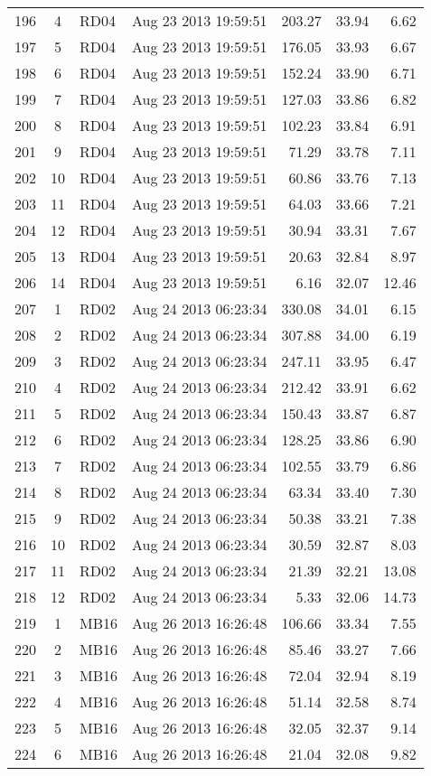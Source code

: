 \documentclass{article}
\begin{document}
\begin{longtable}{ccllrrr}
196&4&RD04&Aug 23 2013 19:59:51&203.27&33.94&6.62\\
197&5&RD04&Aug 23 2013 19:59:51&176.05&33.93&6.67\\
198&6&RD04&Aug 23 2013 19:59:51&152.24&33.90&6.71\\
199&7&RD04&Aug 23 2013 19:59:51&127.03&33.86&6.82\\
200&8&RD04&Aug 23 2013 19:59:51&102.23&33.84&6.91\\
201&9&RD04&Aug 23 2013 19:59:51&71.29&33.78&7.11\\
202&10&RD04&Aug 23 2013 19:59:51&60.86&33.76&7.13\\
203&11&RD04&Aug 23 2013 19:59:51&64.03&33.66&7.21\\
204&12&RD04&Aug 23 2013 19:59:51&30.94&33.31&7.67\\
205&13&RD04&Aug 23 2013 19:59:51&20.63&32.84&8.97\\
206&14&RD04&Aug 23 2013 19:59:51&6.16&32.07&12.46\\
\hline 
207&1&RD02&Aug 24 2013 06:23:34&330.08&34.01&6.15\\
208&2&RD02&Aug 24 2013 06:23:34&307.88&34.00&6.19\\
209&3&RD02&Aug 24 2013 06:23:34&247.11&33.95&6.47\\
210&4&RD02&Aug 24 2013 06:23:34&212.42&33.91&6.62\\
211&5&RD02&Aug 24 2013 06:23:34&150.43&33.87&6.87\\
212&6&RD02&Aug 24 2013 06:23:34&128.25&33.86&6.90\\
213&7&RD02&Aug 24 2013 06:23:34&102.55&33.79&6.86\\
214&8&RD02&Aug 24 2013 06:23:34&63.34&33.40&7.30\\
215&9&RD02&Aug 24 2013 06:23:34&50.38&33.21&7.38\\
216&10&RD02&Aug 24 2013 06:23:34&30.59&32.87&8.03\\
217&11&RD02&Aug 24 2013 06:23:34&21.39&32.21&13.08\\
218&12&RD02&Aug 24 2013 06:23:34&5.33&32.06&14.73\\
\hline 
219&1&MB16&Aug 26 2013 16:26:48&106.66&33.34&7.55\\
220&2&MB16&Aug 26 2013 16:26:48&85.46&33.27&7.66\\
221&3&MB16&Aug 26 2013 16:26:48&72.04&32.94&8.19\\
222&4&MB16&Aug 26 2013 16:26:48&51.14&32.58&8.74\\
223&5&MB16&Aug 26 2013 16:26:48&32.05&32.37&9.14\\
224&6&MB16&Aug 26 2013 16:26:48&21.04&32.08&9.82\\

\end{longtable}
\end{document}
